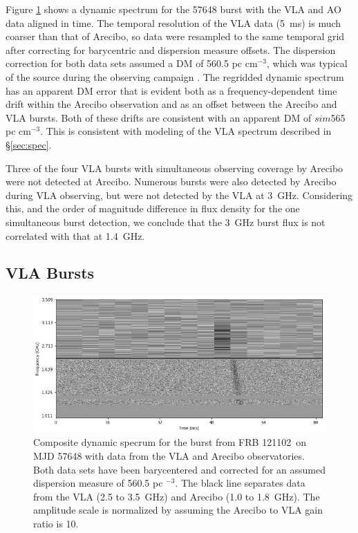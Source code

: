 \documentclass[twocolumn]{aastex61}
\newcommand{\frb}{FRB 121102}
\begin{document}
Figure \ref{fig:sgram} shows a dynamic spectrum for the 57648 burst with the VLA and AO data aligned in time. The temporal resolution of the VLA data (5~ms) is much coarser than that of Arecibo, so data were resampled to the same temporal grid after correcting for barycentric and dispersion measure offsets. The dispersion correction for both data sets assumed a DM of 560.5 pc cm$^{-3}$, which was typical of the source during the observing campaign \citep{WEIRD}. The regridded dynamic spectrum has an apparent DM error that is evident both as a frequency-dependent time drift within the Arecibo observation and as an offset between the Arecibo and VLA bursts. Both of these drifts are consistent with an apparent DM of $sim$565 pc cm$^{-3}$. This is consistent with modeling of the VLA spectrum described in \S \ref{sec:spec}.

Three of the four VLA bursts with simultaneous observing coverage by Arecibo were not detected at Arecibo. Numerous bursts were also detected by Arecibo during VLA observing, but were not detected by the VLA at 3~GHz. Considering this, and the order of magnitude difference in flux density for the one simultaneous burst detection, we conclude that the 3~GHz burst flux is not correlated with that at 1.4~GHz.

\subsection{VLA Bursts}

\begin{figure}[htb]
\begin{center}
 \includegraphics[width=1.9\columnwidth]{aovla_spec.png}
 \caption{Composite dynamic specrum for the burst from \frb\ on MJD 57648 with data from the VLA and Arecibo observatories. Both data sets have been barycentered and corrected for an assumed dispersion measure of 560.5 pc $^{-3}$. The black line separates data from the VLA (2.5 to 3.5~GHz) and Arecibo (1.0 to 1.8~GHz). The amplitude scale is normalized by assuming the Arecibo to VLA gain ratio is 10.
 \label{fig:sgram}}
\end{center}
\end{figure}
\end{document}
